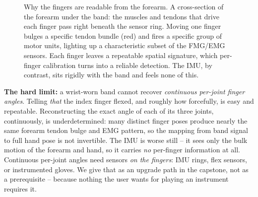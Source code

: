 \begin{figure}[H]
\centering
{}
\caption{Why the fingers are readable from the forearm. A cross-section of the forearm
under the band: the muscles and tendons that drive each finger pass right beneath the
sensor ring. Moving one finger bulges a specific tendon bundle (red) and fires a
specific group of motor units, lighting up a characteristic subset of the FMG/EMG
sensors. Each finger leaves a repeatable spatial signature, which per-finger calibration
turns into a reliable detection. The IMU, by contrast, sits rigidly with the band and
feels none of this.}
\label{ch34:fig-tendon-channel}
\end{figure}

\begin{trapbox}
\textbf{The hard limit:} a wrist-worn band cannot recover
\emph{continuous per-joint finger angles}. Telling \emph{that} the index finger flexed,
and roughly how forcefully, is easy and repeatable. Reconstructing the exact angle of
each of its three joints, continuously, is underdetermined: many distinct finger poses
produce nearly the same forearm tendon bulge and EMG pattern, so the mapping from
band signal to full hand pose is not invertible. The IMU is worse still -- it sees only
the bulk motion of the forearm and hand, so it carries \emph{no} per-finger information
at all. Continuous per-joint angles need sensors \emph{on the fingers}: IMU rings, flex
sensors, or instrumented gloves. We give that as an upgrade path in the capstone, not as a
prerequisite -- because nothing the user wants for playing an instrument requires it.
\end{trapbox}

